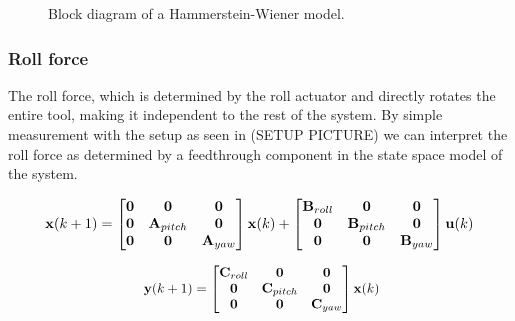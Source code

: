 \begin{figure}[h] 
\caption{Block diagram of a Hammerstein-Wiener model.}
\label{fig:weiner}
\end{figure}

\subsubsection{Roll force}
The roll force, which is determined by the roll actuator and directly rotates the entire tool, making it independent to the rest of the system.
By simple measurement with the setup as seen in (SETUP PICTURE) we can interpret the roll force as determined by a feedthrough component in the state space model of the system.



\begin{equation}
\resizebox{0.91\hsize}{!}{
$\mathbf{x}(k+1) = 
\begin{bmatrix} \mathbf{0} & \mathbf{0} & \mathbf{0}\\
\mathbf{0} & \mathbf{A}_{pitch} &\mathbf{0}\\
\mathbf{0} &\mathbf{0} & \mathbf{A}_{yaw}  \end{bmatrix} 
\mathbf{x}(k) + 
\begin{bmatrix} \mathbf{B}_{roll} & \mathbf{0} & \mathbf{0}\\
\mathbf{0} & \mathbf{B}_{pitch} &\mathbf{0}\\
\mathbf{0} &\mathbf{0} & \mathbf{B}_{yaw}  \end{bmatrix} 
\mathbf{u}(k)$
}
\end{equation}

\begin{equation}\label{eq:allSS}
\resizebox{0.5\hsize}{!}{
	$\mathbf{y}(k+1) = 
	\begin{bmatrix} \mathbf{C}_{roll} & \mathbf{0} & \mathbf{0}\\
	\mathbf{0} & \mathbf{C}_{pitch} &\mathbf{0}\\
	\mathbf{0} &\mathbf{0} & \mathbf{C}_{yaw}  \end{bmatrix} 
	\mathbf{x}(k) $}
\end{equation}

